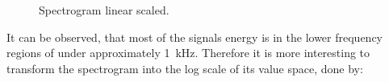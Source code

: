 \begin{figure}[!ht]
  \centering
  \caption{Spectrogram linear scaled.}
  \label{fig:signal_spec_lin_showcase}
\end{figure}
\FloatBarrier
\noindent
It can be observed, that most of the signals energy is in the lower frequency regions of under approximately \SI{1}{\kilo\hertz}.
Therefore it is more interesting to transform the spectrogram into the log scale of its value space, done by:
